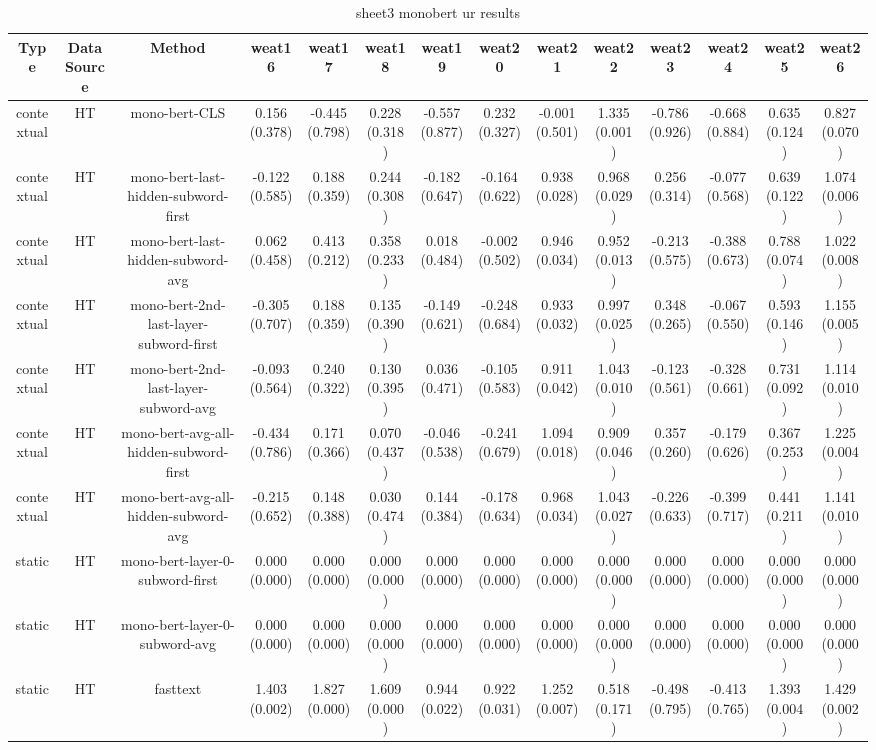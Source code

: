 \begin{sidewaystable}[htb]
    \centering
    \caption{sheet3 monobert ur results}
    \label{appendix_tab:sheet3_monobert_ur_results}
    \small
    \begin{tabular}{@{}cccccccccccccc@{}}
        \toprule
        Type & DataSource & Method & weat16 & weat17 & weat18 & weat19 & weat20 & weat21 & weat22 & weat23 & weat24 & weat25 & weat26 \\
        \midrule
        contextual & HT & mono-bert-CLS & 0.156 (0.378) & -0.445 (0.798) & 0.228 (0.318) & -0.557 (0.877) & 0.232 (0.327) & -0.001 (0.501) & 1.335 (0.001) & -0.786 (0.926) & -0.668 (0.884) & 0.635 (0.124) & 0.827 (0.070) \\
        contextual & HT & mono-bert-last-hidden-subword-first & -0.122 (0.585) & 0.188 (0.359) & 0.244 (0.308) & -0.182 (0.647) & -0.164 (0.622) & 0.938 (0.028) & 0.968 (0.029) & 0.256 (0.314) & -0.077 (0.568) & 0.639 (0.122) & 1.074 (0.006) \\
        contextual & HT & mono-bert-last-hidden-subword-avg & 0.062 (0.458) & 0.413 (0.212) & 0.358 (0.233) & 0.018 (0.484) & -0.002 (0.502) & 0.946 (0.034) & 0.952 (0.013) & -0.213 (0.575) & -0.388 (0.673) & 0.788 (0.074) & 1.022 (0.008) \\
        contextual & HT & mono-bert-2nd-last-layer-subword-first & -0.305 (0.707) & 0.188 (0.359) & 0.135 (0.390) & -0.149 (0.621) & -0.248 (0.684) & 0.933 (0.032) & 0.997 (0.025) & 0.348 (0.265) & -0.067 (0.550) & 0.593 (0.146) & 1.155 (0.005) \\
        contextual & HT & mono-bert-2nd-last-layer-subword-avg & -0.093 (0.564) & 0.240 (0.322) & 0.130 (0.395) & 0.036 (0.471) & -0.105 (0.583) & 0.911 (0.042) & 1.043 (0.010) & -0.123 (0.561) & -0.328 (0.661) & 0.731 (0.092) & 1.114 (0.010) \\
        contextual & HT & mono-bert-avg-all-hidden-subword-first & -0.434 (0.786) & 0.171 (0.366) & 0.070 (0.437) & -0.046 (0.538) & -0.241 (0.679) & 1.094 (0.018) & 0.909 (0.046) & 0.357 (0.260) & -0.179 (0.626) & 0.367 (0.253) & 1.225 (0.004) \\
        contextual & HT & mono-bert-avg-all-hidden-subword-avg & -0.215 (0.652) & 0.148 (0.388) & 0.030 (0.474) & 0.144 (0.384) & -0.178 (0.634) & 0.968 (0.034) & 1.043 (0.027) & -0.226 (0.633) & -0.399 (0.717) & 0.441 (0.211) & 1.141 (0.010) \\
        static & HT & mono-bert-layer-0-subword-first & 0.000 (0.000) & 0.000 (0.000) & 0.000 (0.000) & 0.000 (0.000) & 0.000 (0.000) & 0.000 (0.000) & 0.000 (0.000) & 0.000 (0.000) & 0.000 (0.000) & 0.000 (0.000) & 0.000 (0.000) \\
        static & HT & mono-bert-layer-0-subword-avg & 0.000 (0.000) & 0.000 (0.000) & 0.000 (0.000) & 0.000 (0.000) & 0.000 (0.000) & 0.000 (0.000) & 0.000 (0.000) & 0.000 (0.000) & 0.000 (0.000) & 0.000 (0.000) & 0.000 (0.000) \\
        static & HT & fasttext & 1.403 (0.002) & 1.827 (0.000) & 1.609 (0.000) & 0.944 (0.022) & 0.922 (0.031) & 1.252 (0.007) & 0.518 (0.171) & -0.498 (0.795) & -0.413 (0.765) & 1.393 (0.004) & 1.429 (0.002) \\
        \bottomrule
    \end{tabular}
\end{sidewaystable}